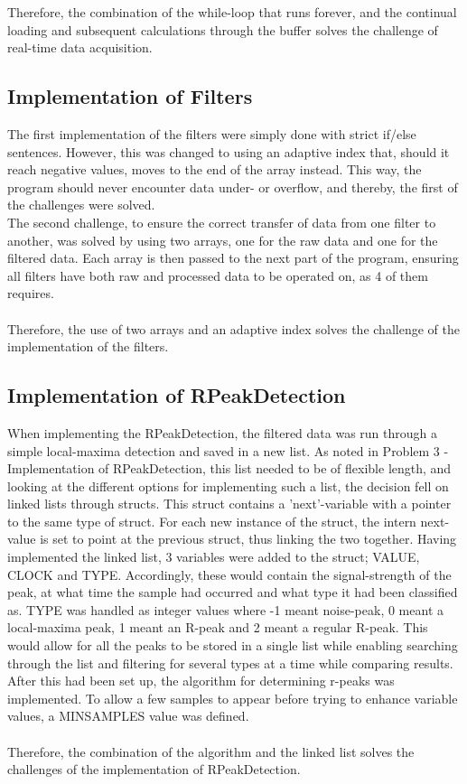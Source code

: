 \documentclass[12pt,a4paper]{article}
\begin{document}
	Therefore, the combination of the while-loop that runs forever, and the continual loading and subsequent calculations through the buffer solves the challenge of real-time data acquisition.\\

\subsection{Implementation of Filters}
	The first implementation of the filters were simply done with strict if/else sentences. However, this was changed to using an adaptive index that, should it reach negative values, moves to the end of the array instead. This way, the program should never encounter data under- or overflow, and thereby, the first of the challenges were solved.\\
	The second challenge, to ensure the correct transfer of data from one filter to another, was solved by using two arrays, one for the raw data and one for the filtered data. Each array is then passed to the next part of the program, ensuring all filters have both raw and processed data to be operated on, as 4 of them requires.\\
	\\
	Therefore, the use of two arrays and an adaptive index solves the challenge of the implementation of the filters.\\
	
\subsection{Implementation of RPeakDetection}
	When implementing the RPeakDetection, the filtered data was run through a simple local-maxima detection and saved in a new list. As noted in Problem 3 - Implementation of RPeakDetection, this list needed to be of flexible length, and looking at the different options for implementing such a list, the decision fell on linked lists through structs. This struct contains a 'next'-variable with a pointer to the same type of struct. For each new instance of the struct, the intern next-value is set to point at the previous struct, thus linking the two together. 
	Having implemented the linked list, 3 variables were added to the struct; VALUE, CLOCK and TYPE. Accordingly, these would contain the signal-strength of the peak, at what time the sample had occurred and what type it had been classified as. TYPE was handled as integer values where -1 meant noise-peak, 0 meant a local-maxima peak, 1 meant an R-peak and 2 meant a regular R-peak. This would allow for all the peaks to be stored in a single list while enabling searching through the list and filtering for several types at a time while comparing results. 
	After this had been set up, the algorithm for determining r-peaks was implemented. To allow a few samples to appear before trying to enhance variable values, a MINSAMPLES value was defined.\\
	\\
	Therefore, the combination of the algorithm and the linked list solves the challenges of the implementation of RPeakDetection.
	
\end{document}
